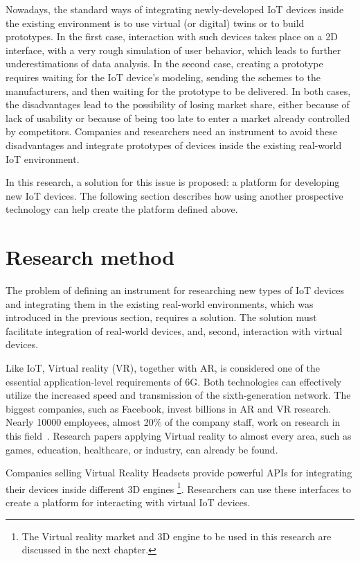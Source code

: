 Nowadays, the standard ways of integrating newly-developed IoT devices inside the existing environment is to use virtual (or digital) twins or to build prototypes. In the first case, interaction with such devices takes place on a 2D interface, with a very rough simulation of user behavior, which leads to further underestimations of data analysis. In the second case, creating a prototype requires waiting for the IoT device's modeling, sending the schemes to the manufacturers, and then waiting for the prototype to be delivered. In both cases, the disadvantages lead to the possibility of losing market share, either because of lack of usability or because of being too late to enter a market already controlled by competitors. Companies and researchers need an instrument to avoid these disadvantages and integrate prototypes of devices inside the existing real-world IoT environment.

In this research, a solution for this issue is proposed: a platform for developing new IoT devices. The following section describes how using another prospective technology can help create the platform defined above.

\section{Research method}

The problem of defining an instrument for researching new types of IoT devices and integrating them in the existing real-world environments, which was introduced in the previous section, requires a solution. The solution must facilitate integration of real-world devices, and, second, interaction with virtual devices.

Like IoT, Virtual reality (VR), together with AR, is considered one of the essential application-level requirements of 6G. Both technologies can effectively utilize the increased speed and transmission of the sixth-generation network. The biggest companies, such as Facebook, invest billions in AR and VR research. Nearly 10000 employees, almost 20\% of the company staff, work on research in this field~\cite{sam_byford_almost_2021}. Research papers applying Virtual reality to almost every area, such as games, education, healthcare, or industry, can already be found.

Companies selling Virtual Reality Headsets provide powerful APIs for integrating their devices inside different 3D engines \footnote{The Virtual reality market and 3D engine to be used in this research are discussed in the next chapter.}. Researchers can use these interfaces to create a platform for interacting with virtual IoT devices.


